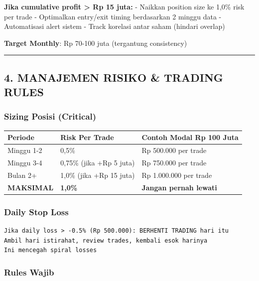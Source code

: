 \documentclass[
  10pt,
  a4paper,
]{article}
\begin{document}
\textbf{Jika cumulative profit \textgreater{} Rp 15 juta:} - Naikkan
position size ke 1,0\% risk per trade - Optimalkan entry/exit timing
berdasarkan 2 minggu data - Automatisasi alert sistem - Track korelasi
antar saham (hindari overlap)

\textbf{Target Monthly}: Rp 70-100 juta (tergantung consistency)

\begin{center}\rule{0.5\linewidth}{0.5pt}\end{center}

\subsection{4. MANAJEMEN RISIKO \& TRADING
RULES}\label{manajemen-risiko-trading-rules}

\subsubsection{Sizing Posisi (Critical)}\label{sizing-posisi-critical}

\begin{longtable}[]{@{}lll@{}}
\toprule\noalign{}
Periode & Risk Per Trade & Contoh Modal Rp 100 Juta \\
\midrule\noalign{}
\endhead
\bottomrule\noalign{}
\endlastfoot
Minggu 1-2 & 0,5\% & Rp 500.000 per trade \\
Minggu 3-4 & 0,75\% (jika +Rp 5 juta) & Rp 750.000 per trade \\
Bulan 2+ & 1,0\% (jika +Rp 15 juta) & Rp 1.000.000 per trade \\
\textbf{MAKSIMAL} & \textbf{1,0\%} & \textbf{Jangan pernah lewati} \\
\end{longtable}

\subsubsection{Daily Stop Loss}\label{daily-stop-loss}

\begin{verbatim}
Jika daily loss > -0.5% (Rp 500.000): BERHENTI TRADING hari itu
Ambil hari istirahat, review trades, kembali esok harinya
Ini mencegah spiral losses
\end{verbatim}

\subsubsection{Rules Wajib}\label{rules-wajib}
\end{document}
